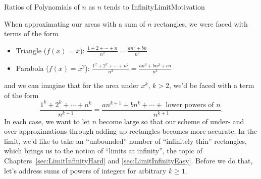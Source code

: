 \begin{observationColor}{Ratios of Polynomials of $n$ as $n$ tends to Infinity}{LimitMotivation}

When approximating our areas with a sum of $n$ rectangles, we were faced with terms of the form
\begin{itemize}
    \item Triangle ($f(x) = x$): $\frac{1 + 2 + \cdots + n}{n^2} = \frac{a n^2 + bn}{n^2} $
    \item Parabola ($f(x) = x^2$): $\frac{1^2 + 2^2 + \cdots + n^2}{n^3} = \frac{an^3 + bn^2 + cn}{n^3} $
\end{itemize}
and we can imagine that for the area under $x^k$, $k>2$, we'd be faced with a term of the form  
$$\frac{1^k + 2^k + \cdots + n^k}{n^{k+1}} = \frac{an^{k+1} + bn^k + \cdots + \text{ lower powers of } n }{n^{k+1}}.$$
In each case, we want to let $n$ become large so that our scheme of under- and over-approximations through adding up rectangles becomes more accurate. In the limit, we'd like to take an ``unbounded'' number of ``infinitely thin'' rectangles, which brings us to the notion of ``limits at infinity'', the topic of Chapters~\ref{sec:LimitInfinityHard} and \ref{sec:LimitInfinityEasy}. Before we do that, let's address sums of powers of integers for arbitrary $k \ge 1$.    
\end{observationColor}




